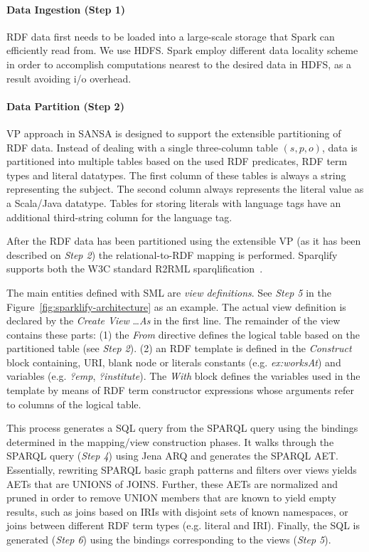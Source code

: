 \paragraph{Data Ingestion (Step 1)} \gls{RDF} data first needs to be loaded into a large-scale storage that Spark can efficiently read from.
We use \gls{HDFS}.
Spark employ different data locality scheme in order to accomplish computations nearest to the desired data in \gls{HDFS}, as a result avoiding i/o overhead. 
\paragraph{Data Partition (Step 2)}
\gls{VP} approach in SANSA is designed to support the extensible partitioning of \gls{RDF} data.
Instead of dealing with a single three-column table $(s, p, o)$, data is partitioned into multiple tables based on the used \gls{RDF} predicates, \gls{RDF} term types and literal datatypes.
The first column of these tables is always a string representing the subject.
The second column always represents the literal value as a Scala/Java datatype.
Tables for storing literals with language tags have an additional third-string column for the language tag.

After the \gls{RDF} data has been partitioned using the extensible \gls{VP} (as it has been described on \textit{Step 2}) the relational-to-RDF mapping is performed. 
Sparqlify supports both the \gls{W3C} standard R2RML
sparqlification~\cite{sml}.

The main entities defined with SML are \textit{view definitions}.
See \textit{Step 5} in the Figure~\ref{fig:sparklify-architecture} as an example.
The actual view definition is declared by the \emph{Create View} \ldots \emph{As} in the first line.
The remainder of the view contains these parts: (1) the \emph{From} directive defines the logical table based on the partitioned table (see \textit{Step 2}).
(2) an \gls{RDF} template is defined in the \emph{Construct} block containing, \gls{URI}, blank node or literals constants (e.g. \emph{ex:worksAt}) and variables (e.g. \emph{?emp}, \emph{?institute}).
The \emph{With} block defines the variables used in the template by means of \gls{RDF} term constructor expressions whose arguments refer to columns of the logical table.

This process generates a SQL query from the \gls{SPARQL} query using the bindings determined in the mapping/view construction phases.
It walks through the \gls{SPARQL} query (\textit{Step 4}) using Jena ARQ and generates the \gls{SPARQL} \gls{AET}. 
Essentially, rewriting \gls{SPARQL} basic graph patterns and filters over views yields \gls{AET}s that are UNIONS of JOINS.
Further, these \gls{AET}s are normalized and pruned in order to remove UNION members that are known to yield empty results, such as joins based on \gls{IRI}s with disjoint sets of known namespaces, or joins between different \gls{RDF} term types (e.g. literal and \gls{IRI}).
Finally, the SQL is generated (\textit{Step 6}) using the bindings corresponding to the views (\textit{Step 5}).

